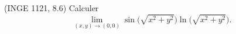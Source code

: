 

\begin{exercice}\label{exoFoncDeuxVar0015}

	(INGE 1121, 8.6) Calculer
	\begin{equation}
		\lim_{(x,y)\to (0,0)}\sin\big( \sqrt{x^2+y^2} \big)\ln\big( \sqrt{x^2+y^2} \big).
	\end{equation}

\end{exercice}
